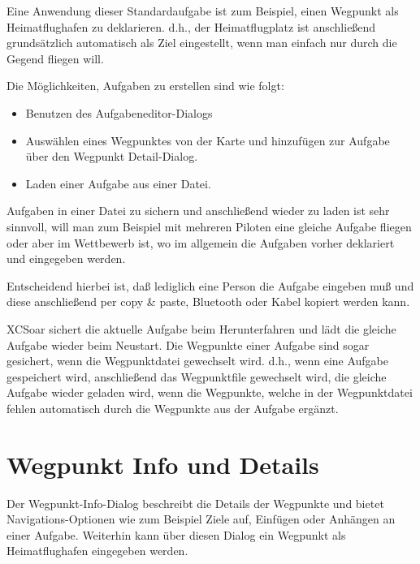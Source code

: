 Eine Anwendung dieser Standardaufgabe ist zum Beispiel, einen Wegpunkt  als Heimatflughafen zu deklarieren. d.h.,  der Heimatflugplatz ist anschließend grundsätzlich automatisch als Ziel eingestellt, wenn man einfach nur durch die Gegend fliegen will.

Die Möglichkeiten, Aufgaben zu erstellen sind wie folgt:
\begin{itemize}
\item Benutzen des Aufgabeneditor-Dialogs
\item Auswählen eines Wegpunktes von der Karte und hinzufügen zur Aufgabe über den Wegpunkt Detail-Dialog.
\item Laden einer Aufgabe aus einer Datei.
\end{itemize}

\tip Aufgaben in einer Datei zu sichern und anschließend wieder zu laden ist sehr sinnvoll,  will man zum Beispiel mit mehreren Piloten eine gleiche Aufgabe fliegen oder aber im Wettbewerb ist, wo im  allgemein die Aufgaben vorher deklariert und eingegeben werden.

Entscheidend hierbei ist, daß lediglich eine Person die Aufgabe eingeben muß und diese anschließend  per copy \& paste,  Bluetooth oder Kabel kopiert werden kann.

\textsf{XCSoar} sichert die aktuelle Aufgabe beim Herunterfahren und lädt die gleiche Aufgabe wieder beim Neustart.  Die Wegpunkte einer Aufgabe sind sogar gesichert, wenn die Wegpunktdatei gewechselt wird. d.h., wenn eine Aufgabe gespeichert wird, anschließend das Wegpunktfile gewechselt wird, die gleiche Aufgabe wieder geladen  wird, wenn die Wegpunkte, welche in der Wegpunktdatei  fehlen automatisch durch die Wegpunkte aus der Aufgabe ergänzt.

\section{Wegpunkt Info und Details }

Der Wegpunkt-Info-Dialog beschreibt die Details der Wegpunkte  und bietet Navigations-Optionen wie zum Beispiel \textsf{Ziele auf}, \textsf{Einfügen} oder \textsf{Anhängen} an einer Aufgabe. Weiterhin kann über diesen Dialog ein Wegpunkt als Heimatflughafen eingegeben werden.

